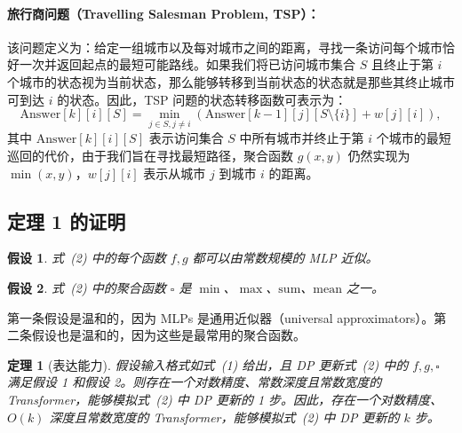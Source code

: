 \documentclass[11pt,UTF8,fontset=fandol]{ctexart}
\newtheorem{theorem}{定理}
\newtheorem{assumption}{假设}
\begin{document}
\paragraph{旅行商问题（Travelling Salesman Problem, TSP）：}该问题定义为：给定一组城市以及每对城市之间的距离，寻找一条访问每个城市恰好一次并返回起点的最短可能路线。如果我们将已访问城市集合 $S$ 且终止于第 $i$ 个城市的状态视为当前状态，那么能够转移到当前状态的状态就是那些其终止城市可到达 $i$ 的状态。因此，TSP 问题的状态转移函数可表示为：
\[
\mathrm{Answer}[k][i][S] = \min_{j\in S, j\neq i}\left(\mathrm{Answer}[k-1][j][S\setminus\{i\}] + w[j][i]\right),
\]
其中 $\mathrm{Answer}[k][i][S]$ 表示访问集合 $S$ 中所有城市并终止于第 $i$ 个城市的最短巡回的代价，由于我们旨在寻找最短路径，聚合函数 $g(x,y)$ 仍然实现为 $\min(x,y)$，$w[j][i]$ 表示从城市 $j$ 到城市 $i$ 的距离。

\subsection{定理 1 的证明}

\begin{assumption}
式~(2) 中的每个函数 $f, g$ 都可以由常数规模的 MLP 近似。
\end{assumption}
\begin{assumption}
式~(2) 中的聚合函数 $\square$ 是 $\min$、$\max$、$\mathrm{sum}$、$\mathrm{mean}$ 之一。
\end{assumption}

第一条假设是温和的，因为 MLPs 是通用近似器（universal approximators）。第二条假设也是温和的，因为这些是最常用的聚合函数。

\begin{theorem}[表达能力]
假设输入格式如式~(1) 给出，且 DP 更新式~(2) 中的 $f, g, \square$ 满足假设 1 和假设 2。则存在一个对数精度、常数深度且常数宽度的 Transformer，能够模拟式~(2) 中 DP 更新的 1 步。因此，存在一个对数精度、$O(k)$ 深度且常数宽度的 Transformer，能够模拟式~(2) 中 DP 更新的 $k$ 步。
\end{theorem}
\end{document}
